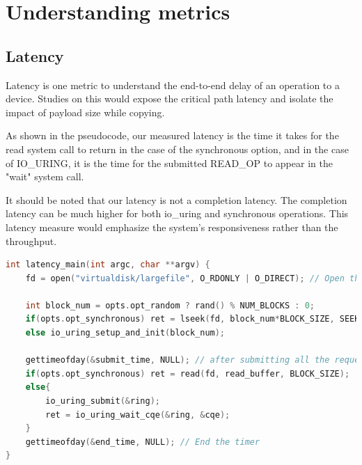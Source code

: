 \documentclass{article}
\begin{document}
\section{Understanding metrics }
\subsection{Latency}
Latency is one metric to understand the end-to-end delay of an operation to a device. Studies on this would expose the critical 
path latency and isolate the impact of payload size while copying.

As shown in the pseudocode, our measured latency is the time it takes for the read system call to return in the case of the 
synchronous option, and in the case of IO\_URING, it is the time for the submitted READ\_OP to appear in the "wait" system call. 

It should be noted that our latency is not a completion latency. The completion latency can be much higher for both io\_uring 
and synchronous operations. This latency measure would emphasize the system's responsiveness rather than the throughput. 

\begin{lstlisting}[language=C, caption=Latency of Concerned Operations shown in the Psedocode, basicstyle=\tiny]
int latency_main(int argc, char **argv) {
    fd = open("virtualdisk/largefile", O_RDONLY | O_DIRECT); // Open the file

    int block_num = opts.opt_random ? rand() % NUM_BLOCKS : 0;
    if(opts.opt_synchronous) ret = lseek(fd, block_num*BLOCK_SIZE, SEEK_SET);
    else io_uring_setup_and_init(block_num);

    gettimeofday(&submit_time, NULL); // after submitting all the request
    if(opts.opt_synchronous) ret = read(fd, read_buffer, BLOCK_SIZE);
    else{
        io_uring_submit(&ring); 
        ret = io_uring_wait_cqe(&ring, &cqe);
    }
    gettimeofday(&end_time, NULL); // End the timer
}
\end{lstlisting}
\end{document}
